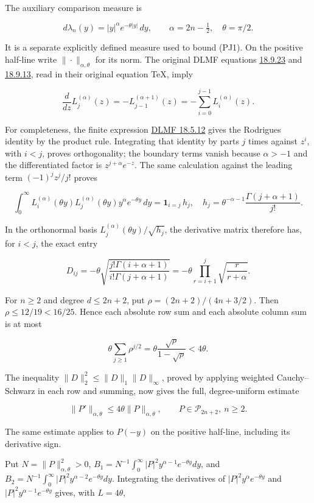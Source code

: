 \documentclass[10pt]{article}
\begin{document}
The auxiliary comparison measure is

\[
d\lambda_n(y)=|y|^{\alpha}e^{-\theta|y|}\,dy,
\qquad \alpha=2n-\tfrac12,\quad\theta=\pi/2.
\tag{PJ5}
\]

It is a separate explicitly defined measure used to bound (PJ1). On the positive half-line write \(\|\cdot\|_{\alpha,\theta}\) for its norm. The original DLMF equations \href{https://dlmf.nist.gov/18.9.E23}{18.9.23} and \href{https://dlmf.nist.gov/18.9.E13}{18.9.13}, read in their original equation TeX, imply

\[
\frac{d}{dz}L_j^{(\alpha)}(z)
=-L_{j-1}^{(\alpha+1)}(z)
=-\sum_{i=0}^{j-1}L_i^{(\alpha)}(z).
\tag{PJ6}
\]

For completeness, the finite expression \href{https://dlmf.nist.gov/18.5.E12}{DLMF 18.5.12} gives the Rodrigues identity by the product rule. Integrating that identity by parts \(j\) times against \(z^i\), with \(i<j\), proves orthogonality; the boundary terms vanish because \(\alpha>-1\) and the differentiated factor is \(z^{j+\alpha}e^{-z}\). The same calculation against the leading term \((-1)^jz^j/j!\) proves

\[
\int_0^\infty L_i^{(\alpha)}(\theta y)L_j^{(\alpha)}(\theta y)
y^\alpha e^{-\theta y}\,dy
=\mathbf1_{i=j}\,h_j,
\quad h_j=\theta^{-\alpha-1}\frac{\Gamma(j+\alpha+1)}{j!}.
\tag{PJ7}
\]

In the orthonormal basis \(L_j^{(\alpha)}(\theta y)/\sqrt{h_j}\), the derivative matrix therefore has, for \(i<j\), the exact entry

\[
D_{ij}=-\theta\sqrt{\frac{j!\Gamma(i+\alpha+1)}{i!\Gamma(j+\alpha+1)}}
=-\theta\prod_{r=i+1}^j\sqrt{\frac r{r+\alpha}}.
\tag{PJ8}
\]

For \(n\ge2\) and degree \(d\le2n+2\), put \(\rho=(2n+2)/(4n+3/2)\). Then \(\rho\le12/19<16/25\). Hence each absolute row sum and each absolute column sum is at most

\[
\theta\sum_{j\ge1}\rho^{j/2}
=\theta\frac{\sqrt\rho}{1-\sqrt\rho}<4\theta.
\]

The inequality \(\|D\|_2^2\le\|D\|_1\|D\|_\infty\), proved by applying weighted Cauchy--Schwarz in each row and summing, now gives the full, degree-uniform estimate

\[
\|P'\|_{\alpha,\theta}\le4\theta\|P\|_{\alpha,\theta},
\qquad P\in\mathcal P_{2n+2},\ n\ge2.
\tag{PJ9}
\]

The same estimate applies to \(P(-y)\) on the positive half-line, including its derivative sign.

Put \(N=\|P\|_{\alpha,\theta}^2>0\), \(B_1=N^{-1}\int_0^\infty|P|^2y^{\alpha-1}e^{-\theta y}dy\), and \(B_2=N^{-1}\int_0^\infty|P|^2y^{\alpha-2}e^{-\theta y}dy\). Integrating the derivatives of \(|P|^2y^\alpha e^{-\theta y}\) and \(|P|^2y^{\alpha-1}e^{-\theta y}\) gives, with \(L=4\theta\),
\end{document}
